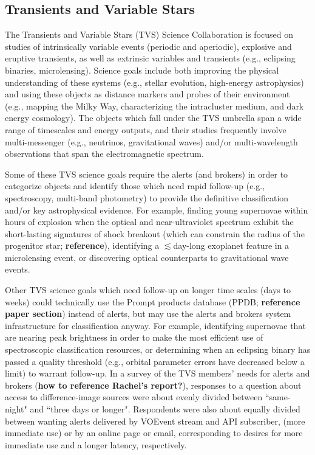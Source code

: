 \subsection{Transients and Variable Stars}\label{ssec:sci_tvs}

The Transients and Variable Stars (TVS) Science Collaboration is focused on studies of intrinsically variable events (periodic and aperiodic), explosive and eruptive transients, as well as extrinsic variables and transients (e.g., eclipsing binaries, microlensing). Science goals include both improving the physical understanding of these systems (e.g., stellar evolution, high-energy astrophysics) and using these objects as distance markers and probes of their environment (e.g., mapping the Milky Way, characterizing the intracluster medium, and dark energy cosmology). The objects which fall under the TVS umbrella span a wide range of timescales and energy outputs, and their studies frequently involve multi-messenger (e.g., neutrinos, gravitational waves) and/or multi-wavelength observations that span the electromagnetic spectrum. 

Some of these TVS science goals require the alerts (and brokers) in order to categorize objects and identify those which need rapid follow-up (e.g., spectroscopy, multi-band photometry) to provide the definitive classification and/or key astrophysical evidence. For example, finding young supernovae within hours of explosion when the optical and near-ultraviolet spectrum exhibit the short-lasting signatures of shock breakout (which can constrain the radius of the progenitor star; {\bf reference}), identifying a $\lesssim$day-long exoplanet feature in a microlensing event, or discovering optical counterparts to gravitational wave events. 

Other TVS science goals which need follow-up on longer time scales (days to weeks) could technically use the Prompt products database (PPDB; {\bf reference paper section}) instead of alerts, but may use the alerts and brokers system infrastructure for classification anyway. For example, identifying supernovae that are nearing peak brightness in order to make the most efficient use of spectroscopic classification resources, or determining when an eclipsing binary has passed a quality threshold (e.g., orbital parameter errors have decreased below a limit) to warrant follow-up. In a survey of the TVS members' needs for alerts and brokers ({\bf how to reference Rachel's report?}), responses to a question about access to difference-image sources were about evenly divided between ``same-night" and ``three days or longer". Respondents were also about equally divided between wanting alerts delivered by VOEvent stream and API subscriber, (more immediate use) or by an online page or email, corresponding to desires for more immediate use and a longer latency, respectively.

